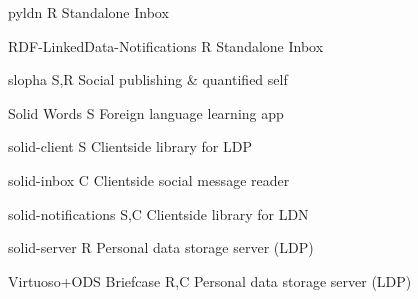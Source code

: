 \documentclass[a4paper]{llncs}
\begin{document}
                                    
                                        \empty pyldn
                                        R
                                        Standalone Inbox
                                    
                                    
                                        \empty RDF-LinkedData-Notifications
                                        R
                                        Standalone Inbox
                                    
                                    
                                        \empty slopha
                                        S,R
                                        Social publishing \& quantified self
                                    
                                    
                                        \empty Solid Words
                                        S
                                        Foreign language learning app
                                    
                                    
                                        \empty solid-client
                                        S
                                        Clientside library for LDP
                                    
                                    
                                        \empty solid-inbox
                                        C
                                        Clientside social message reader
                                    
                                    
                                        \empty solid-notifications
                                        S,C
                                        Clientside library for LDN
                                    
                                    
                                        \empty solid-server
                                        R
                                        Personal data storage server (LDP)
                                    
                                    
                                        \empty Virtuoso+\empty ODS Briefcase
                                        R,C
                                        Personal data storage server (LDP)
                                    
                                
                            
\end{document}

